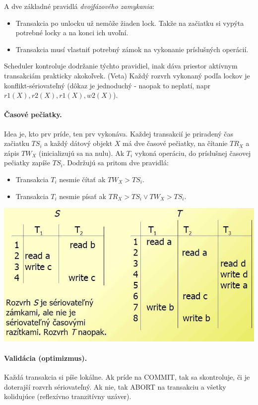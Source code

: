 \documentclass[10pt,a4paper]{article}
\begin{document}
A dve základné pravidlá \emph{dvojfázového zamykania}: 
\begin{itemize}
\item Transakcia po unlocku už nemôže žiaden lock. Takže na začiatku si vypýta potrebné locky a na konci ich uvoľní. 
\item Transakcia musí vlastniť potrebný zámok na vykonanie príslušných operácií. 
\end{itemize}

Scheduler kontroluje dodržanie týchto pravidiel, inak dáva priestor aktívnym transakciám prakticky akokoľvek. 
(Veta) Každý rozvrh vykonaný podľa lockov je konflikt-sériovateľný (dôkaz je jednoduchý - naopak to neplatí, napr $r1(X), r2(X), r1(X), w2(X)$). 

\paragraph{Časové pečiatky.}
Idea je, kto prv príde, ten prv vykonáva. 
Každej transakcií je priradený čas začiatku $TS_i$ a každý dátový objekt $X$ má dve časové pečiatky, na čítanie $TR_X$ a zápis $TW_X$ (inicializujú sa na nulu). Ak $T_i$ vykoná operáciu, do príslušnej časovej pečiatky zapíše $TS_i$. Dodržujú sa pritom dve pravidlá: 
\begin{itemize}
\item Transakcia $T_i$ nesmie čítať ak $TW_X > TS_i$.
\item Transakcia $T_i$ nesmie písať ak $TR_X > TS_i \vee TW_X > TS_i$.
\end{itemize}

\begin{center}
\includegraphics[scale=0.5]{db_lock_ts.png}
\end{center}

\paragraph{Validácia (optimizmus).}
Každá transakcia si píše lokálne. Ak príde na COMMIT, tak sa skontroluje, či je doterajší rozvrh sériovateľný. Ak nie, tak ABORT na transakciu a všetky kolidujúce (reflexívno tranzitívny uzáver). 
\end{document}
